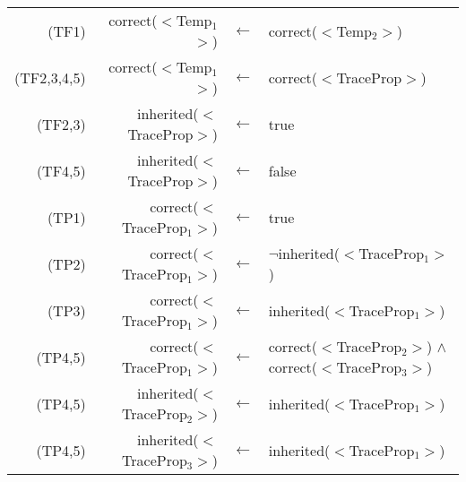 {\small
\begin{longtable}{rrcl}
\textsf{(TF1)} & \textsf{correct}($<$Temp$_1$$>$) & \(\leftarrow\)& 
                 \textsf{correct}($<$Temp$_2$$>$) \\
\textsf{(TF2,3,4,5)} & \textsf{correct}($<$Temp$_1$$>$) &\(\leftarrow\)&
                               \textsf{correct}($<$TraceProp$>$)\smallskip\\ 

\textsf{(TF2,3)}&  \textsf{inherited}($<$TraceProp$>$) &
              \(\leftarrow\)& \textsf{true}\\
\textsf{(TF4,5)}&  \textsf{inherited}($<$TraceProp$>$) &
              \(\leftarrow\)& \textsf{false}\medskip\\



\textsf{(TP1)} & \textsf{correct}($<$TraceProp$_1$$>$) &
               \(\leftarrow\)& \textsf{true}\\
\textsf{(TP2)} & \textsf{correct}($<$TraceProp$_1$$>$) &\(\leftarrow\)& 
                 \(\neg\)\textsf{inherited}($<$TraceProp$_1$$>$)\\
\textsf{(TP3)} & \textsf{correct}($<$TraceProp$_1$$>$) &\(\leftarrow\)& 
                 \textsf{inherited}($<$TraceProp$_1$$>$)
                 \smallskip\\

\textsf{(TP4,5)} & \textsf{correct}($<$TraceProp$_1$$>$) &
               \(\leftarrow\)& \textsf{correct}($<$TraceProp$_2$$>$) $\wedge$  
                               \textsf{correct}($<$TraceProp$_3$$>$)\smallskip\\


\textsf{(TP4,5)} & \textsf{inherited}($<$TraceProp$_2$$>$) &
               \(\leftarrow\)& \textsf{inherited}($<$TraceProp$_1$$>$)\\
\textsf{(TP4,5)} & \textsf{inherited}($<$TraceProp$_3$$>$) &
               \(\leftarrow\)& \textsf{inherited}($<$TraceProp$_1$$>$)\\

\end{longtable}
}
